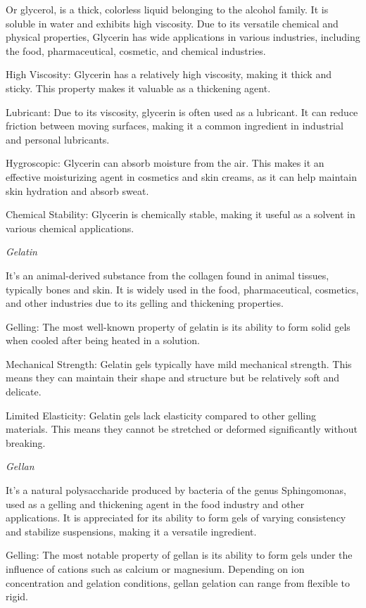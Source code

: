 Or glycerol, is a thick, colorless liquid belonging to the alcohol family. It is soluble in water and exhibits high viscosity. Due to its versatile chemical and physical properties, Glycerin has wide applications in various industries, including the food, pharmaceutical, cosmetic, and chemical industries.
\item High Viscosity: Glycerin has a relatively high viscosity, making it thick and sticky. This property makes it valuable as a thickening agent.
\item Lubricant: Due to its viscosity, glycerin is often used as a lubricant. It can reduce friction between moving surfaces, making it a common ingredient in industrial and personal lubricants.
\item Hygroscopic: Glycerin can absorb moisture from the air. This makes it an effective moisturizing agent in cosmetics and skin creams, as it can help maintain skin hydration and absorb sweat.
\item Chemical Stability: Glycerin is chemically stable, making it useful as a solvent in various chemical applications.

\textit{Gelatin}

It's an animal-derived substance from the collagen found in animal tissues, typically bones and skin. It is widely used in the food, pharmaceutical, cosmetics, and other industries due to its gelling and thickening properties.
\item Gelling: The most well-known property of gelatin is its ability to form solid gels when cooled after being heated in a solution.
\item Mechanical Strength: Gelatin gels typically have mild mechanical strength. This means they can maintain their shape and structure but be relatively soft and delicate.
\item Limited Elasticity: Gelatin gels lack elasticity compared to other gelling materials. This means they cannot be stretched or deformed significantly without breaking.

\textit{Gellan}

It's a natural polysaccharide produced by bacteria of the genus Sphingomonas, used as a gelling and thickening agent in the food industry and other applications. It is appreciated for its ability to form gels of varying consistency and stabilize suspensions, making it a versatile ingredient.

\item Gelling: The most notable property of gellan is its ability to form gels under the influence of cations such as calcium or magnesium. Depending on ion concentration and gelation conditions, gellan gelation can range from flexible to rigid.

